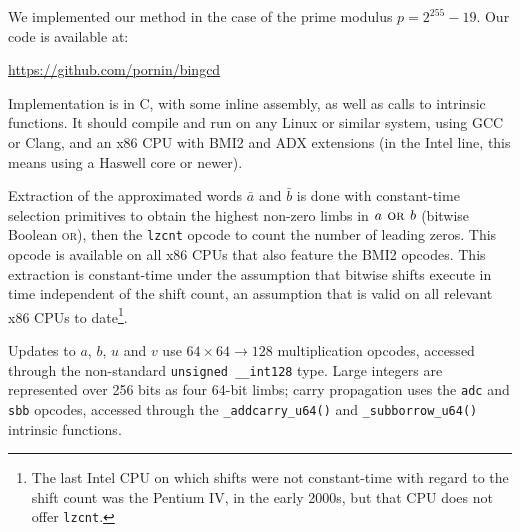 \documentclass{llncs}
\begin{document}
We implemented our method in the case of the prime modulus
$p = 2^{255}-19$. Our code is available at:
\begin{center}
    \url{https://github.com/pornin/bingcd}
\end{center}
Implementation is in C, with some inline assembly, as well as calls to
intrinsic functions. It should compile and run on any Linux or similar
system, using GCC or Clang, and an x86 CPU with BMI2 and ADX extensions
(in the Intel line, this means using a Haswell core or newer).

Extraction of the approximated words $\bar a$ and $\bar b$ is done with
constant-time selection primitives to obtain the highest non-zero limbs
in $a \text{\textsc{\ or\ }} b$ (bitwise Boolean \textsc{or}), then
the \verb+lzcnt+ opcode to count the number of leading zeros. This
opcode is available on all x86 CPUs that also feature the BMI2 opcodes.
This extraction is constant-time under the assumption that bitwise shifts
execute in time independent of the shift count, an assumption that is
valid on all relevant x86 CPUs to date\footnote{The last Intel CPU on
which shifts were not constant-time with regard to the shift count was
the Pentium IV, in the early 2000s, but that CPU does not offer
\texttt{lzcnt}.}.

Updates to $a$, $b$, $u$ and $v$ use $64\times 64\rightarrow 128$
multiplication opcodes, accessed through the non-standard
\verb+unsigned __int128+ type. Large integers are represented over 256
bits as four 64-bit limbs; carry propagation uses the \verb+adc+ and
\verb+sbb+ opcodes, accessed through the \verb+_addcarry_u64()+ and
\verb+_subborrow_u64()+ intrinsic functions.
\end{document}
